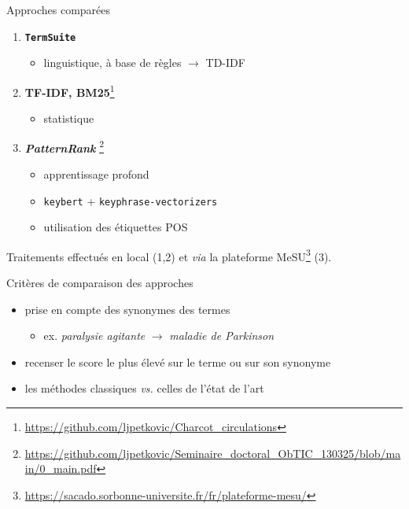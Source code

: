 \documentclass[xcolor={table,usenames,dvipsnames}]{beamer}
\let\olditem\item
\renewcommand{\item}{%
\olditem\vspace{0pt}}
\begin{document}
\begin{frame}{Approches comparées}
	\begin{enumerate}
		\item \textcolor{deepblue}{\textbf{\texttt{TermSuite}}} \citep{cram2016terminology}
		\begin{itemize}
			\item linguistique, à base de règles $\rightarrow$ TD-IDF
		\end{itemize} 
		\item \textcolor{deepblue}{\textbf{TF-IDF, BM25}}\footnote{\url{https://github.com/ljpetkovic/Charcot_circulations}} \citep{robertson1976relevance}  
		\begin{itemize}
			\item statistique
		\end{itemize}
		\item \textcolor{deepblue}{\textbf{\textit{PatternRank}}} \citep{schopf2022}\footnote{\url{https://github.com/ljpetkovic/Seminaire_doctoral_ObTIC_130325/blob/main/0_main.pdf}}
		\begin{itemize}
			\item apprentissage profond
			\item \texttt{keybert} + \texttt{keyphrase-vectorizers}
			\item utilisation des étiquettes POS
		\end{itemize} 
	\end{enumerate}
	
	\begin{block}{\vspace*{-0.6mm}}
			Traitements effectués en local (1,2) et \textit{via} la plateforme MeSU\footnote{\url{https://sacado.sorbonne-universite.fr/fr/plateforme-mesu/}} (3).
	\end{block}

\end{frame}

\begin{frame}{Critères de comparaison des approches}
	\begin{itemize}
		\item prise en compte des synonymes des termes
		\begin{itemize}
			\item ex. \textit{paralysie agitante} $\rightarrow$ \textit{maladie de Parkinson} 
		\end{itemize}
					\item recenser le score le plus élevé sur le terme ou sur son synonyme
					\item les méthodes classiques \textit{vs.} celles de l'état de l'art
	\end{itemize}
	
	\end{frame}
	
\end{document}
